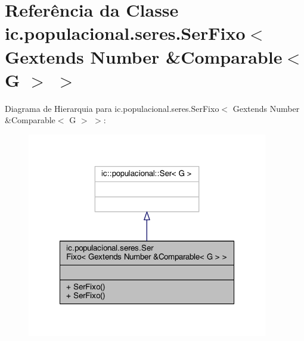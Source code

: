 \hypertarget{classic_1_1populacional_1_1seres_1_1_ser_fixo_3_01_gextends_01_number_01_6_comparable_3_01_g_01_4_01_4}{\section{Referência da Classe ic.\-populacional.\-seres.\-Ser\-Fixo$<$ Gextends Number \&Comparable$<$ G $>$ $>$}
\label{classic_1_1populacional_1_1seres_1_1_ser_fixo_3_01_gextends_01_number_01_6_comparable_3_01_g_01_4_01_4}
}


Diagrama de Hierarquia para ic.\-populacional.\-seres.\-Ser\-Fixo$<$ Gextends Number \&Comparable$<$ G $>$ $>$\-:\nopagebreak
\begin{figure}[H]
\begin{center}
\leavevmode
\includegraphics[width=298pt]{classic_1_1populacional_1_1seres_1_1_ser_fixo_3_01_gextends_01_number_01_6_comparable_3_01_g_01_4_01_4__inherit__graph}
\end{center}
\end{figure}


